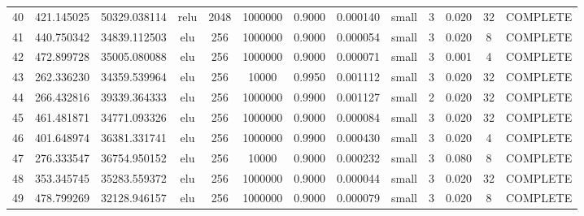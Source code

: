\begin{longtable}{ccccccccccccc}
                       40 &                 421.145025 &                       50329.038114 &            relu &        2048 &      1000000 & 0.9000 &       0.000140 &     small &             3 & 0.020 &          32 & COMPLETE \\
                       41 &                 440.750342 &                       34839.112503 &             elu &         256 &      1000000 & 0.9000 &       0.000054 &     small &             3 & 0.020 &           8 & COMPLETE \\
                       42 &                 472.899728 &                       35005.080088 &             elu &         256 &      1000000 & 0.9000 &       0.000071 &     small &             3 & 0.001 &           4 & COMPLETE \\
                       43 &                 262.336230 &                       34359.539964 &             elu &         256 &        10000 & 0.9950 &       0.001112 &     small &             3 & 0.020 &          32 & COMPLETE \\
                       44 &                 266.432816 &                       39339.364333 &             elu &         256 &      1000000 & 0.9900 &       0.001127 &     small &             2 & 0.020 &          32 & COMPLETE \\
                       45 &                 461.481871 &                       34771.093326 &             elu &         256 &      1000000 & 0.9000 &       0.000084 &     small &             3 & 0.020 &          32 & COMPLETE \\
                       46 &                 401.648974 &                       36381.331741 &             elu &         256 &      1000000 & 0.9900 &       0.000430 &     small &             3 & 0.020 &           4 & COMPLETE \\
                       47 &                 276.333547 &                       36754.950152 &             elu &         256 &        10000 & 0.9000 &       0.000232 &     small &             3 & 0.080 &           8 & COMPLETE \\
                       48 &                 353.345745 &                       35283.559372 &             elu &         256 &      1000000 & 0.9000 &       0.000044 &     small &             3 & 0.020 &          32 & COMPLETE \\
                       49 &                 478.799269 &                       32128.946157 &             elu &         256 &      1000000 & 0.9000 &       0.000079 &     small &             3 & 0.020 &           8 & COMPLETE \\

\end{longtable}
